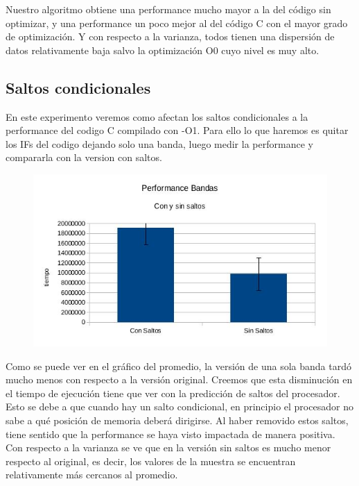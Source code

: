 \documentclass[a4paper]{article}
\begin{document}
Nuestro algoritmo obtiene una performance mucho mayor a la del código sin optimizar, y una performance un poco mejor al del código C con el mayor grado de optimización. Y con respecto a la varianza, todos tienen una dispersión de datos relativamente baja salvo la optimización O0 cuyo nivel es muy alto.

\newpage
\subsection{Saltos condicionales}

En este experimento veremos como afectan los saltos condicionales a la performance del codigo C compilado con -O1. Para ello lo que haremos es quitar los IFs del codigo dejando solo una banda, luego medir la performance y compararla con la version con saltos.

\begin{figure}[h!]
  \begin{center}
  \includegraphics[scale=0.66]{Graficos3.1/per.jpg}
  \label{nombreparareferenciar1}
  \end{center}
\end{figure}

Como se puede ver en el gráfico del promedio, la versión de una sola banda tardó mucho menos con respecto a la versión original. Creemos que esta disminución en el tiempo de ejecución tiene que ver con la predicción de saltos del procesador. Esto se debe a que cuando hay un salto condicional, en principio el procesador no sabe a qué posición de memoria deberá dirigirse. Al haber removido estos saltos, tiene sentido que la performance se haya visto impactada de manera positiva. Con respecto a la varianza se ve que en la versión sin saltos es mucho menor respecto al original, es decir, los valores de la muestra se encuentran relativamente más cercanos al promedio.
\end{document}
